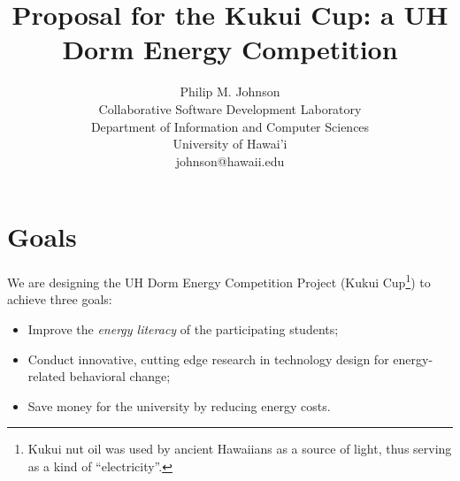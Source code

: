 \documentclass[11pt]{article}
\begin{document}
\title{Proposal for the Kukui Cup: a UH Dorm Energy Competition}

\author{Philip M. Johnson \\
Collaborative Software Development Laboratory \\
Department of Information and Computer Sciences \\
University of Hawai'i \\
johnson@hawaii.edu \\
}

\maketitle

\tableofcontents
\newpage

\section{Goals}

We are designing the UH Dorm Energy Competition Project (Kukui
Cup\footnote{Kukui nut oil was used by ancient Hawaiians as a source of light,
  thus serving as a kind of ``electricity''.}) to achieve three goals:
\begin{itemize}
\item Improve the {\em energy literacy} of the participating students;
\item Conduct innovative, cutting edge research in technology design for
  energy-related behavioral change;
\item Save money for the university by reducing energy costs.
\end{itemize}
\end{document}
